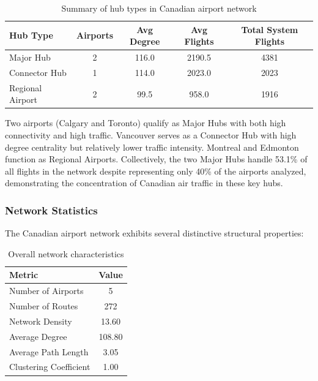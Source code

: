 \documentclass[10pt]{article}
\begin{document}
\begin{table}[h!]
    \centering
    \caption{Summary of hub types in Canadian airport network}
    \begin{tabular}{lcccc}
        \toprule
        Hub Type & Airports & Avg Degree & Avg Flights & Total System Flights \\
        \midrule
        Major Hub        & 2 & 116.0 & 2190.5 & 4381 \\
        Connector Hub    & 1 & 114.0 & 2023.0 & 2023 \\
        Regional Airport & 2 & 99.5  & 958.0  & 1916 \\
        \bottomrule
    \end{tabular}
\end{table}

Two airports (Calgary and Toronto) qualify as Major Hubs with both high connectivity and high traffic. Vancouver serves as a Connector Hub with high degree centrality but relatively lower traffic intensity. Montreal and Edmonton function as Regional Airports. Collectively, the two Major Hubs handle 53.1\% of all flights in the network despite representing only 40\% of the airports analyzed, demonstrating the concentration of Canadian air traffic in these key hubs.

\subsubsection{Network Statistics}

The Canadian airport network exhibits several distinctive structural properties:

\begin{table}[h!]
    \centering
    \caption{Overall network characteristics}
    \begin{tabular}{lc}
        \toprule
        Metric & Value \\
        \midrule
        Number of Airports       & 5 \\
        Number of Routes         & 272 \\
        Network Density          & 13.60 \\
        Average Degree           & 108.80 \\
        Average Path Length      & 3.05 \\
        Clustering Coefficient   & 1.00 \\
        \bottomrule
    \end{tabular}
\end{table}
\end{document}
